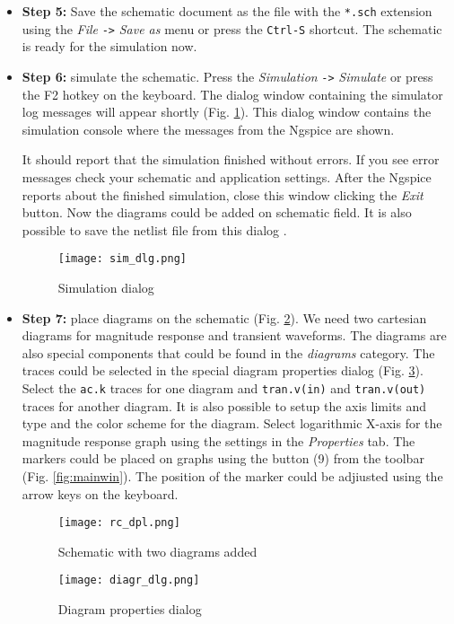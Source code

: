 \begin{itemize}
 \item \textbf{Step 5:} Save the schematic document as the file with the \verb|*.sch| extension using the \textit{File} \verb|->| \textit{Save as} menu or press the \verb|Ctrl-S| shortcut. The schematic is ready for the simulation now.

 \item \textbf{Step 6:} simulate the schematic. Press the \textit{Simulation} \verb|->| \textit{Simulate} or press the F2 hotkey on the keyboard. The dialog window containing the simulator log messages will appear shortly (Fig. \ref{fig:sim_dlg}). This dialog window contains the simulation console where the messages from the Ngspice are shown.

 It should report that the simulation finished without errors. If you see error messages check your schematic and application settings. After the Ngspice reports about the finished simulation, close this window clicking the \emph{Exit} button. Now the diagrams could be added on schematic field. It is also possible to save the netlist file from this dialog
 .
  \begin{figure}[!ht]
  \begin{center}
    \texttt{[image: sim\_dlg.png]}
  \end{center}
  \caption{Simulation dialog} \label{fig:sim_dlg}

\end{figure}

\item \textbf{Step 7:} place diagrams on the schematic (Fig. \ref{fig:rc_dpl}). We need two cartesian diagrams for magnitude response and transient waveforms. The diagrams are also special components that could be found in the \emph{diagrams} category. The traces could be selected in the special diagram properties dialog (Fig. \ref{fig:diagr_dlg}). Select the \verb|ac.k| traces for one diagram and \verb|tran.v(in)| and \verb|tran.v(out)| traces for another diagram. It is also possible to setup the axis limits and type and the color scheme for the diagram. Select logarithmic X-axis for the magnitude response graph using the settings in the \emph{Properties} tab. The markers could be placed on graphs using the button (9) from the toolbar (Fig. \ref{fig:mainwin}). The position of the marker could be adjiusted using the arrow keys on the keyboard.

  \begin{figure}[!ht]
  \begin{center}
    \texttt{[image: rc\_dpl.png]}
  \end{center}
  \caption{Schematic with two diagrams added} \label{fig:rc_dpl}
  \end{figure}

    \begin{figure}[!ht]
  \begin{center}
    \texttt{[image: diagr\_dlg.png]}
  \end{center}
  \caption{Diagram properties dialog} \label{fig:diagr_dlg}
  \end{figure}

\end{itemize}

